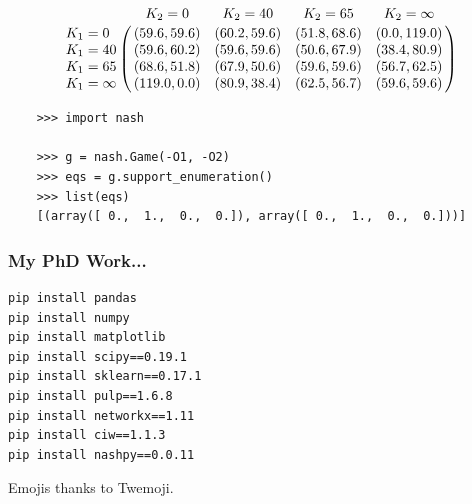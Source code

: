 \documentclass{beamer}
\begin{document}

\begin{frame}[fragile]

\begin{equation*}
\end{equation*}
  $$\bordermatrix{ & K_{2} = 0 & K_{2} = 40 & K_{2} = 65 & K_{2} = \infty \cr
  K_{1} = 0 & (59.6, 59.6) & (60.2, 59.6) & (51.8, 68.6) & (0.0, 119.0) \cr
  K_{1} = 40 & (59.6, 60.2) & (59.6, 59.6) & (50.6, 67.9) & (38.4, 80.9) \cr
  K_{1} = 65 & (68.6, 51.8) & (67.9, 50.6) & (59.6, 59.6) & (56.7, 62.5) \cr
  K_{1} = \infty & (119.0, 0.0) & (80.9, 38.4) & (62.5, 56.7) & (59.6, 59.6) \cr}$$
  \vspace{10mm}
  \pause
  \footnotesize{
  \begin{verbatim}
    >>> import nash

    >>> g = nash.Game(-O1, -O2)
    >>> eqs = g.support_enumeration()
    >>> list(eqs)
    [(array([ 0.,  1.,  0.,  0.]), array([ 0.,  1.,  0.,  0.]))]
  \end{verbatim}
  }
\end{frame}

\begin{frame}
\frametitle{My PhD Work...}
\begin{center}

\end{center}
\end{frame}

\begin{frame}[fragile]
\begin{verbatim}
pip install pandas
pip install numpy
pip install matplotlib
pip install scipy==0.19.1
pip install sklearn==0.17.1
pip install pulp==1.6.8
pip install networkx==1.11
pip install ciw==1.1.3
pip install nashpy==0.0.11
\end{verbatim}
\footnotesize{Emojis thanks to Twemoji.}
\end{frame}
\end{document}
